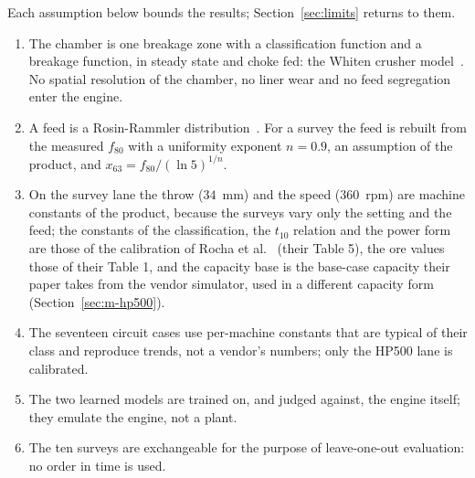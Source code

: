 Each assumption below bounds the results; Section~\ref{sec:limits} returns to them.
\begin{enumerate}
\item The chamber is one breakage zone with a classification function and a breakage function, in steady state and choke
fed: the Whiten crusher model~\cite{whiten1972,napier1996}. No spatial resolution of the chamber, no liner wear and no feed
segregation enter the engine.
\item A feed is a Rosin-Rammler distribution~\cite{rosin1933}. For a survey the feed is rebuilt from the measured $f_{80}$
with a uniformity exponent $n=0.9$, an assumption of the product, and $x_{63}=f_{80}/(\ln 5)^{1/n}$.
\item On the survey lane the throw ($34$~mm) and the speed ($360$~rpm) are machine constants of the product, because the
surveys vary only the setting and the feed; the constants of the classification, the $t_{10}$ relation and the power form are those of the calibration of Rocha
et al.~\cite{rocha2024} (their Table 5), the ore values those of their Table 1, and the capacity base is the base-case
capacity their paper takes from the vendor simulator, used in a different capacity form (Section~\ref{sec:m-hp500}).
\item The seventeen circuit cases use per-machine constants that are typical of their class and reproduce trends, not a
vendor's numbers; only the HP500 lane is calibrated.
\item The two learned models are trained on, and judged against, the engine itself; they emulate the engine, not a plant.
\item The ten surveys are exchangeable for the purpose of leave-one-out evaluation: no order in time is used.
\end{enumerate}
